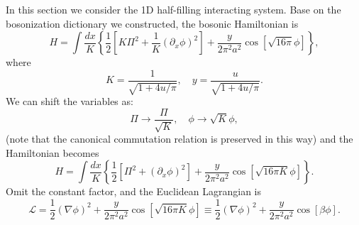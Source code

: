 \documentclass[aps,prb,superscriptaddress,nofootinbib]{revtex4}
\begin{document}
In this section we consider the 1D half-filling interacting system.
Base on the bosonization dictionary we constructed, the bosonic Hamiltonian is
\begin{equation}
	H = \int \frac{dx}{K} \left\{ \frac{1}{2}\left[K \Pi^2 + \frac{1}{K}(\partial_x\phi)^2 \right] + \frac{y}{2\pi^2 a^2} \cos\left[\sqrt{16\pi}\phi\right] \right\},
\end{equation}
where
\begin{equation}
	K = \frac{1}{\sqrt{1+4u/\pi}}, \quad
	y = \frac{u}{\sqrt{1+4u/\pi}}.
\end{equation}
We can shift the variables as:
\begin{equation}
	\Pi \rightarrow \frac{\Pi}{\sqrt K}, \quad
	\phi \rightarrow \sqrt K \phi,
\end{equation}
(note that the canonical commutation relation is preserved in this way) and the Hamiltonian becomes
\begin{equation}
	H = \int \frac{dx}{K} \left\{ \frac{1}{2}\left[\Pi^2 + (\partial_x\phi)^2 \right] + \frac{y}{2\pi^2 a^2} \cos\left[\sqrt{16\pi K}\phi\right] \right\}.
\end{equation}
Omit the constant factor, and the Euclidean Lagrangian is
\begin{equation}
	\mathcal L = \frac{1}{2}(\nabla \phi)^2 + \frac{y}{2\pi^2 a^2} \cos\left[\sqrt{16\pi K}\phi\right]
	\equiv \frac{1}{2}(\nabla \phi)^2 + \frac{y}{2\pi^2 a^2} \cos\left[\beta\phi\right].
\end{equation}
\end{document}
